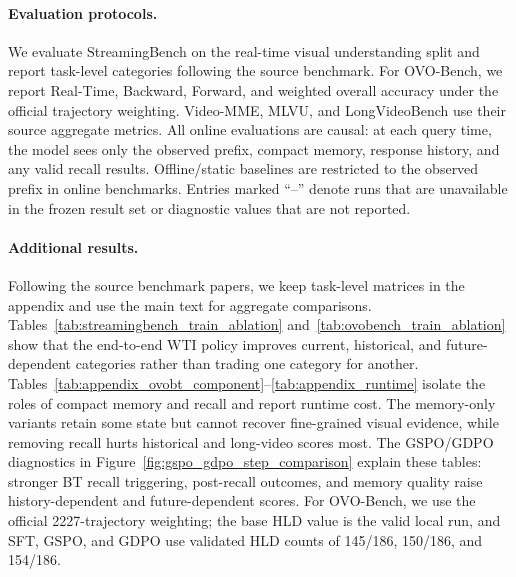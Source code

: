 \paragraph{Evaluation protocols.}
We evaluate StreamingBench on the real-time visual understanding split and report task-level categories following the source benchmark.
For OVO-Bench, we report Real-Time, Backward, Forward, and weighted overall accuracy under the official trajectory weighting.
Video-MME, MLVU, and LongVideoBench use their source aggregate metrics.
All online evaluations are causal: at each query time, the model sees only the observed prefix, compact memory, response history, and any valid recall results.
Offline/static baselines are restricted to the observed prefix in online benchmarks.
Entries marked ``--'' denote runs that are unavailable in the frozen result set or diagnostic values that are not reported.

\paragraph{Additional results.}
Following the source benchmark papers, we keep task-level matrices in the appendix and use the main text for aggregate comparisons.
Tables~\ref{tab:streamingbench_train_ablation} and~\ref{tab:ovobench_train_ablation} show that the end-to-end WTI policy improves current, historical, and future-dependent categories rather than trading one category for another.
Tables~\ref{tab:appendix_ovobt_component}--\ref{tab:appendix_runtime} isolate the roles of compact memory and recall and report runtime cost.
The memory-only variants retain some state but cannot recover fine-grained visual evidence, while removing recall hurts historical and long-video scores most.
The GSPO/GDPO diagnostics in Figure~\ref{fig:gspo_gdpo_step_comparison} explain these tables: stronger BT recall triggering, post-recall outcomes, and memory quality raise history-dependent and future-dependent scores.
For OVO-Bench, we use the official 2227-trajectory weighting; the base HLD value is the valid local run, and SFT, GSPO, and GDPO use validated HLD counts of 145/186, 150/186, and 154/186.

